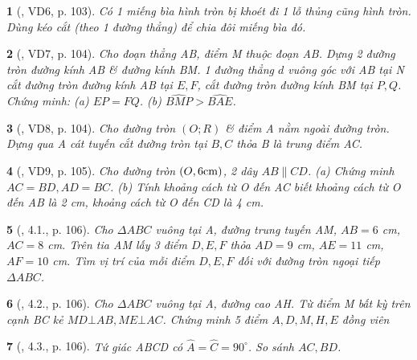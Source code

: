 \documentclass{article}
\newtheorem{baitoan}{}
\begin{document}
\begin{baitoan}[\cite{Binh_boi_duong_Toan_9_tap_1}, VD6, p. 103]
	Có 1 miếng bìa hình tròn bị khoét đi 1 lỗ thủng cũng hình tròn. Dùng kéo cắt (theo 1 đường thẳng) để chia đôi miếng bìa đó.
\end{baitoan}

\begin{baitoan}[\cite{Binh_boi_duong_Toan_9_tap_1}, VD7, p. 104]
	Cho đoạn thẳng AB, điểm M thuộc đoạn AB. Dựng 2 đường tròn đường kính AB \& đường kính BM. 1 đường thẳng $d$ vuông góc với AB tại N cắt đường tròn đường kính AB tại $E,F$, cắt đường tròn đường kính BM tại $P,Q$. Chứng minh: (a) $EP = FQ$. (b) $\widehat{BMP} > \widehat{BAE}$.
\end{baitoan}

\begin{baitoan}[\cite{Binh_boi_duong_Toan_9_tap_1}, VD8, p. 104]
	Cho đường tròn $(O;R)$ \& điểm A nằm ngoài đường tròn. Dựng qua A cát tuyến cắt đường tròn tại $B,C$ thỏa B là trung điểm AC.
\end{baitoan}

\begin{baitoan}[\cite{Binh_boi_duong_Toan_9_tap_1}, VD9, p. 105]
	Cho đường tròn $(O,6{\rm cm})$, 2 dây $AB\parallel CD$. (a) Chứng minh $AC = BD,AD = BC$. (b) Tính khoảng cách từ O đến AC biết khoảng cách từ O đến AB là {\rm2 cm}, khoảng cách từ O đến CD là {\rm4 cm}.
\end{baitoan}

\begin{baitoan}[\cite{Binh_boi_duong_Toan_9_tap_1}, 4.1., p. 106]
	Cho $\Delta ABC$ vuông tại A, đường trung tuyến AM, $AB = 6$ {\rm cm}, $AC = 8$ {\rm cm}. Trên tia AM lấy 3 điểm $D,E,F$ thỏa $AD = 9$ {\rm cm}, $AE = 11$ {\rm cm}, $AF = 10$ {\rm cm}. Tìm vị trí của mỗi điểm $D,E,F$ đối với đường tròn ngoại tiếp $\Delta ABC$.
\end{baitoan}

\begin{baitoan}[\cite{Binh_boi_duong_Toan_9_tap_1}, 4.2., p. 106]
	Cho $\Delta ABC$ vuông tại A, đường cao AH. Từ điểm M bất kỳ trên cạnh BC kẻ $MD\bot AB,ME\bot AC$. Chứng minh 5 điểm $A,D,M,H,E$ đồng viên
\end{baitoan}

\begin{baitoan}[\cite{Binh_boi_duong_Toan_9_tap_1}, 4.3., p. 106]
	Tứ giác ABCD có $\widehat{A} = \widehat{C} = 90^\circ$. So sánh $AC,BD$.
\end{baitoan}
\end{document}
